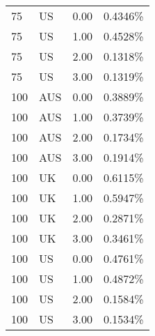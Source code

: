 \begin{table}[ht]
\begin{tabular}{llrl}
  75 & US & 0.00 & 0.4346\% \\ 
  75 & US & 1.00 & 0.4528\% \\ 
  75 & US & 2.00 & 0.1318\% \\ 
  75 & US & 3.00 & 0.1319\% \\ 
  100 & AUS & 0.00 & 0.3889\% \\ 
  100 & AUS & 1.00 & 0.3739\% \\ 
  100 & AUS & 2.00 & 0.1734\% \\ 
  100 & AUS & 3.00 & 0.1914\% \\ 
  100 & UK & 0.00 & 0.6115\% \\ 
  100 & UK & 1.00 & 0.5947\% \\ 
  100 & UK & 2.00 & 0.2871\% \\ 
  100 & UK & 3.00 & 0.3461\% \\ 
  100 & US & 0.00 & 0.4761\% \\ 
  100 & US & 1.00 & 0.4872\% \\ 
  100 & US & 2.00 & 0.1584\% \\ 
  100 & US & 3.00 & 0.1534\% \\ 
   \hline
\end{tabular}
\end{table}
